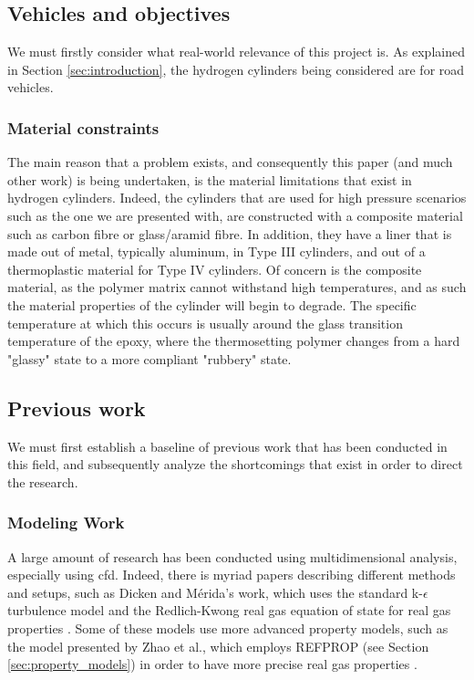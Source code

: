 


\subsection{Vehicles and objectives}

We must firstly consider what real-world relevance of this project is. As explained in Section \ref{sec:introduction}, the hydrogen cylinders being considered are for road vehicles. 

\subsubsection{Material constraints}

The main reason that a problem exists, and consequently this paper (and much other work) is being undertaken, is the material limitations that exist in hydrogen cylinders. Indeed, the cylinders that are used for high pressure scenarios such as the one we are presented with, are constructed with a composite material such as carbon fibre or glass/aramid fibre. In addition, they have a liner that is made out of metal, typically aluminum, in Type III cylinders, and out of a thermoplastic material for Type IV cylinders. Of concern is the composite material, as the polymer matrix cannot withstand high temperatures, and as such the material properties of the cylinder will begin to degrade. The specific temperature at which this occurs is usually around the glass transition temperature of the epoxy, where the thermosetting polymer changes from a hard "glassy" state to a more compliant "rubbery" state.

\subsection{Previous work}



We must first establish a baseline of previous work that has been conducted in this field, and subsequently analyze the shortcomings that exist in order to direct the research.

\subsubsection{Modeling Work}
A large amount of research has been conducted using multidimensional analysis, especially using \gls{cfd}. Indeed, there is myriad papers describing different methods and setups, such as Dicken and M\'erida's work, which uses the standard  k-$\epsilon$ turbulence model  and the Redlich-Kwong real gas equation of state for real gas properties \cite{Dicken2007a}. 
Some of these models use more advanced property models, such as the model presented by Zhao et al., which employs REFPROP (see Section \ref{sec:property_models}) in order to have more precise real gas properties \cite{Zhao2012}.

